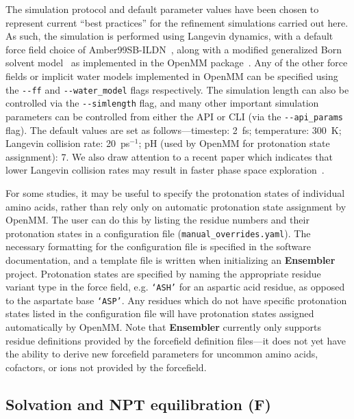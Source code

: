 \documentclass[10pt,letterpaper]{article}
\begin{document}
The simulation protocol and default parameter values have been chosen to represent current ``best practices'' for the refinement simulations carried out here.
As such, the simulation is performed using Langevin dynamics, with a default force field choice of Amber99SB-ILDN~\cite{amber99sb-ildn}, along with a modified generalized Born solvent model~\cite{gbsa-obc1} as implemented in the OpenMM package~\cite{eastman:jctc:2012:openmm}.
Any of the other force fields or implicit water models implemented in OpenMM can be specified using the {\tt -{}-ff} and {\tt -{}-water\_model} flags respectively.
The simulation length can also be controlled via the {\tt -{}-simlength} flag, and many other important simulation parameters can be controlled from either the API or CLI (via the {\tt -{}-api\_params} flag).
The default values are set as follows---timestep: 2~fs; temperature: 300~K; Langevin collision rate: 20~ps$^{-1}$; pH (used by OpenMM for protonation state assignment): 7.
We also draw attention to a recent paper which indicates that lower Langevin collision rates may result in faster phase space exploration~\cite{basconi:jctc:2013:collision-rates}.

For some studies, it may be useful to specify the protonation states of individual amino acids, rather than rely only on automatic protonation state assignment by OpenMM.
The user can do this by listing the residue numbers and their protonation states in a configuration file ({\tt manual\_overrides.yaml}).
The necessary formatting for the configuration file is specified in the software documentation, and a template file is written when initializing an {\bf Ensembler} project.
Protonation states are specified by naming the appropriate residue variant type in the force field, e.g. {\tt `ASH'} for an aspartic acid residue, as opposed to the aspartate base {\tt `ASP'}.
Any residues which do not have specific protonation states listed in the configuration file will have protonation states assigned automatically by OpenMM.
Note that {\bf Ensembler} currently only supports residue definitions provided by the forcefield definition files---it does not yet have the ability to derive new forcefield parameters for uncommon amino acids, cofactors, or ions not provided by the forcefield.

\subsection*{Solvation and NPT equilibration (F)}
\end{document}
